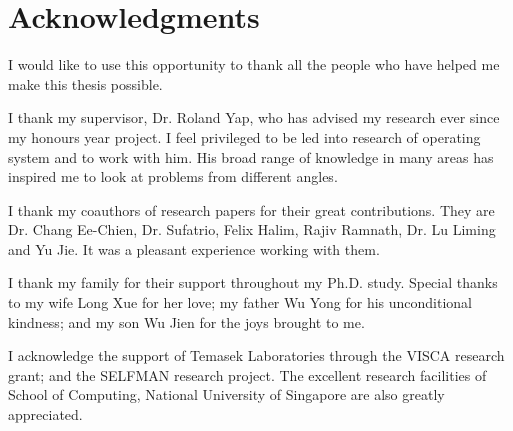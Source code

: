 \chapter{Acknowledgments}

I would like to use this opportunity to thank all the people who have
helped me make this thesis possible.

I thank my supervisor, Dr. Roland Yap, who has advised my research ever
since my honours year project.
I feel privileged to be led into research of operating system and to work
with him.
His broad range of knowledge in many areas has inspired me to look at
problems from different angles.

I thank my coauthors of research papers for their great contributions.
They are Dr. Chang Ee-Chien, Dr. Sufatrio, Felix Halim, Rajiv Ramnath,
Dr. Lu Liming and Yu Jie.
It was a pleasant experience working with them.

I thank my family for their support throughout my Ph.D. study.
Special thanks to my wife Long Xue for her love;
my father Wu Yong for his unconditional kindness;
and my son Wu Jien for the joys brought to me.

I acknowledge the support of Temasek Laboratories through the
VISCA research grant; and the SELFMAN research project.
The excellent research facilities of School of Computing, National
University of Singapore are also greatly appreciated.
